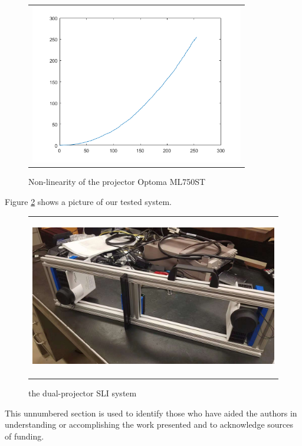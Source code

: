 \documentclass[]{spie}  %
\begin{document}
\begin{figure}
   \begin{center}
   \begin{tabular}{c}
   \includegraphics[height=7cm]{wolut.png}
   \end{tabular}
   \end{center}
   \caption{Non-linearity of the projector Optoma ML750ST}
   \label{Fig:2}
   \end{figure} 


Figure \ref{Fig:3} shows a picture of our tested system.

\begin{figure}
   \begin{center}
   \begin{tabular}{c}
   \includegraphics[height=7cm]{dpphoto.jpg}
   \end{tabular}
   \end{center}
   \caption{the dual-projector SLI system}
   \label{Fig:3}
   \end{figure} 

\acknowledgments     %
This unnumbered section is used to identify those who have aided the authors in understanding or accomplishing the work presented and to acknowledge sources of funding.  


\end{document}
